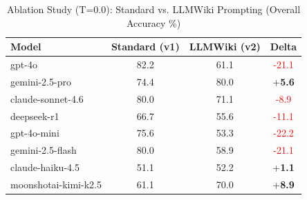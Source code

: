 \begin{table}[ht]
\centering
\caption{Ablation Study (T=0.0): Standard vs. LLMWiki Prompting (Overall Accuracy \%)}
\label{tab:ablation}
\begin{tabular}{lccc}
\toprule
Model & Standard (v1) & LLMWiki (v2) & Delta \\ 
\midrule
gpt-4o & 82.2 & 61.1 & \textcolor{red}{-21.1} \\ 
gemini-2.5-pro & 74.4 & 80.0 & +\textbf{5.6} \\ 
claude-sonnet-4.6 & 80.0 & 71.1 & \textcolor{red}{-8.9} \\ 
deepseek-r1 & 66.7 & 55.6 & \textcolor{red}{-11.1} \\ 
gpt-4o-mini & 75.6 & 53.3 & \textcolor{red}{-22.2} \\ 
gemini-2.5-flash & 80.0 & 58.9 & \textcolor{red}{-21.1} \\ 
claude-haiku-4.5 & 51.1 & 52.2 & +\textbf{1.1} \\ 
moonshotai-kimi-k2.5 & 61.1 & 70.0 & +\textbf{8.9} \\ 
\bottomrule
\end{tabular}
\end{table}